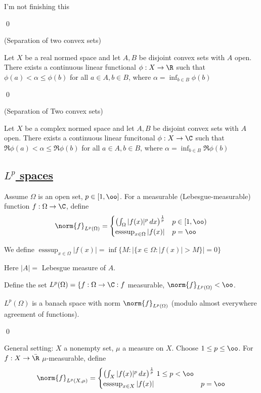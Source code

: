 \documentclass[x11names,reqno,14pt]{extarticle}
\begin{document}
I'm not finishing this

\qed


\thm(Separation of two convex sets)

Let $X$ be a real normed space and let $A, B$ be disjoint convex sets with $A$ open. There exists a continuous linear functional $\phi:X\to\R$ such that $\phi(a) < \alpha \leq \phi(b)$ for all $a\in A, b \in B$, where $\alpha = \inf_{b\in B}\phi(b)$

\proof

\qed

\thm(Separation of Two convex sets)

Let $X$ be a complex normed space and let $A, B$ be disjoint convex sets with $A$ open. There exists a continuous linear funcitonal $\phi:X\to\C$ such that $\Re\phi(a) < \alpha \leq \Re\phi(b)$ for all $a \in A, b \in B$, where $\alpha = \inf_{b\in B}\Re\phi(b)$

\subsection*{\underline{$L^p$ spaces}}


Assume $\Omega$ is an open set, $p \in [1,\oo]$. For a measurable (Lebesgue-measurable) function $f:\Omega\to\C$, define
\[
\norm{f}_{L^p(\Omega)} = \begin{cases} \left(\int_{\Omega}|f(x)|^p\,dx\right)^{\frac{1}{p}} & p \in [1,\oo) \\
\operatorname{esssup}_{x\in\Omega}|f(x)| & p = \oo \end{cases}
\]

We define $\operatorname{esssup}_{x\in\Omega}|f(x)| = \inf\{M : |\{x\in\Omega: |f(x)| > M\}| = 0 \}$

Here $|A| = $ Lebesgue measure of $A$. 

Define the set $L^p(\Omega) = \{f:\Omega\to\C:f$ measurable, $\norm{f}_{L^p(\Omega)}<\oo$. 

\thm

$L^p(\Omega)$ is a banach space with norm $\norm{f}_{L^p(\Omega)}$ (modulo almost everywhere agreement of functions). 

\proof

\qed

General setting: $X$ a nonempty set, $\mu$ a measure on $X$. Choose $1 \leq p \leq \oo$. For $f:X\to\bar{\R}$ $\mu$-measurable, define
\[
\norm{f}_{L^p(X, \mu)} = \begin{cases} \left(\int_X|f(x)|^p\,dx\right)^{\frac{1}{p}}\, 1 \leq p < \oo \\ \operatorname{esssup}_{x\in X}|f(x)| & p = \oo \end{cases}
\]
\end{document}
